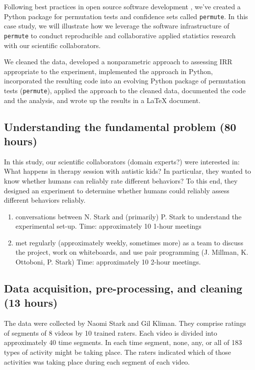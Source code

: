 \documentclass[]{article}
\begin{document}
Following best practices in open source software development
\cite{millman2014developing}, we've created a Python package for permutation
tests and confidence sets called \texttt{permute}.
In this case study, we will illustrate how we leverage the software
infrastructure of \texttt{permute} to conduct reproducible and collaborative
applied statistics research with our scientific collaborators.


We cleaned the data, developed a nonparametric approach to assessing IRR
appropriate to the experiment, implemented the approach in Python,
incorporated the resulting code into an evolving Python package of
permutation tests (\texttt{permute}), applied the approach to the cleaned
data, documented the code and the analysis, and wrote up the results in
a LaTeX document. 

\subsection{Understanding the fundamental problem (80 hours)}

In this study, our scientific collaborators (domain experts?) were interested
in:  What happens in therapy session with autistic kids?
In particular, they wanted to know whether humans can reliably rate different
behaviors?
To this end, they designed an experiment to determine whether humans could
reliably assess different behaviors reliably.


  \begin{enumerate}
  \def\labelenumii{\roman{enumii}.}
  \itemsep1pt\parskip0pt
  \item
    conversations between N. Stark and (primarily) P. Stark to
    understand the experimental set-up. Time: approximately 10 1-hour
    meetings
  \item
    met regularly (approximately weekly, sometimes more) as a team to
    discuss the project, work on whiteboards, and use pair programming
    (J. Millman, K. Ottoboni, P. Stark) Time: approximately 10 2-hour
    meetings.
  \end{enumerate}
  

\subsection{Data acquisition, pre-processing, and cleaning (13 hours)}

The data were collected by Naomi Stark and Gil Kliman. They
comprise ratings of segments of 8 videos by 10 trained raters. Each
video is divided into approximately 40 time segments. In each time
segment, none, any, or all of 183 types of activity might be taking
place. The raters indicated which of those activities was taking place
during each segment of each video.
\end{document}
